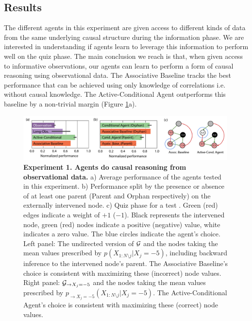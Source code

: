 \subsection*{Results}

The different agents in this experiment are given access to different kinds of data from the same underlying causal structure during the information phase. We are interested in understanding if agents learn to leverage this information to perform well on the quiz phase. The main conclusion we reach is that, when given access to informative observations, our agents can learn to perform a form of causal reasoning using observational data. The Associative Baseline tracks the best performance that can be achieved using only knowledge of correlations i.e. without causal knowledge. The Active-Conditional Agent outperforms this baseline  by a non-trivial margin (Figure \ref{fig:expt1}a). 

\begin{figure}[t!]
\centering
   \includegraphics[width=0.99\textwidth]{figures/fig_expt1.pdf}
    \caption{\textbf{Experiment 1. Agents do causal reasoning from observational data.} a) Average performance of the agents tested in this experiment. b) Performance split by the presence or absence of at least one parent (Parent and Orphan respectively) on the externally intervened node. c) Quiz phase for a test \CBN. Green (red) edges indicate a weight of $+1$ ($-1$). Black represents the intervened node, green (red) nodes indicate a positive (negative) value, white indicates a zero value. The blue circles indicate the agent's choice. Left panel: The undirected version of ${\cal G}$ and the nodes taking the mean values prescribed by $p(X_{1:N\setminus j }|X_j=-5)$, including backward inference to the intervened node's parent. The Associative Baseline's choice is consistent with maximizing these (incorrect) node values. Right panel: ${\cal G}_{\rightarrow X_j=-5}$ and the nodes taking the mean values prescribed by $p_{\rightarrow X_j=-5}(X_{1:N\setminus j }|X_j=-5)$. The Active-Conditional Agent's choice is consistent with maximizing these (correct) node values.}%
    \label{fig:expt1}%
\end{figure}


